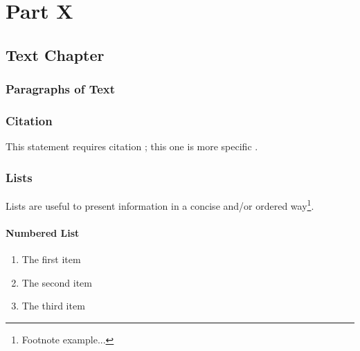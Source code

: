 \documentclass[12pt,fleqn]{book} %
\begin{document}
\part{Part X}



\chapter{Text Chapter}

\section{Paragraphs of Text}

\lipsum[1-7] %


\section{Citation}

This statement requires citation \cite{book_key}; this one is more specific \cite[122]{article_key}.


\section{Lists}

Lists are useful to present information in a concise and/or ordered way\footnote{Footnote example...}.

\subsection{Numbered List}

\begin{enumerate}
\item The first item
\item The second item
\item The third item
\end{enumerate}
\end{document}
